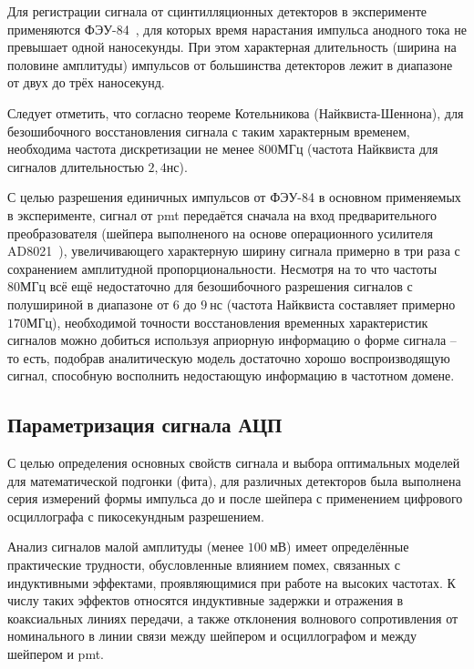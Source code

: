 Для регистрации сигнала от сцинтилляционных детекторов в эксперименте
применяются ФЭУ-84~\cite{soviet_pmts}, для которых время нарастания
импульса анодного тока не превышает одной наносекунды. При этом
характерная длительность (ширина на половине амплитуды) импульсов от
большинства детекторов лежит в диапазоне от двух до трёх наносекунд.

Следует отметить, что согласно теореме Котельникова (Найквиста-Шеннона),
для безошибочного восстановления сигнала с таким характерным временем,
необходима частота дискретизации не менее $800\text{МГц}$ (частота
Найквиста для сигналов длительностью $2{,}4\text{нс}$).

С целью разрешения единичных импульсов от ФЭУ-84 в основном применяемых в
эксперименте, сигнал от \acrshort{pmt} передаётся сначала на вход
предварительного преобразователя (шейпера выполненого на основе
операционного усилителя AD8021~\cite{ad8021}), увеличивающего характерную
ширину сигнала примерно в три раза с сохранением амплитудной
пропорциональности. Несмотря
на то что частоты $80\text{МГц}$ всё ещё недостаточно для безошибочного
разрешения сигналов с полушириной в диапазоне от $6$ до $9~\text{нс}$
(частота Найквиста составляет примерно $170\text{МГц}$), необходимой
точности восстановления временных характеристик сигналов можно
добиться используя априорную информацию о форме сигнала -- то есть,
подобрав аналитическую модель достаточно хорошо воспроизводящую сигнал,
способную восполнить недостающую информацию в частотном домене.

\subsection{Параметризация сигнала АЦП}

С целью определения основных свойств сигнала и выбора оптимальных моделей для
математической подгонки (фита), для различных детекторов была выполнена серия
измерений формы импульса до и после шейпера с применением цифрового
осциллографа с пикосекундным разрешением.

Анализ сигналов малой амплитуды (менее $100~\text{мВ}$) имеет
определённые практические трудности, обусловленные влиянием помех,
связанных с индуктивными эффектами, проявляющимися при работе на высоких
частотах. К числу таких эффектов относятся индуктивные задержки и
отражения в коаксиальных линиях передачи, а также отклонения
волнового сопротивления от номинального в линии связи между
шейпером и осциллографом и между шейпером и \acrshort{pmt}.

